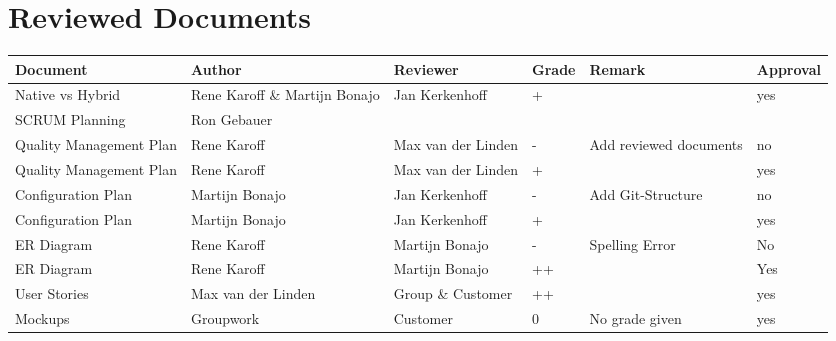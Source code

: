 \pagestyle{plain}
\begin{sidewaystable}
	\section*{Reviewed Documents}
		\begin{longtable}[htbp]{ l l l l l l}
			\textbf{Document} & \textbf{Author} & \textbf{Reviewer} & \textbf{Grade} & \textbf{Remark} & \textbf{Approval}\\ \hline
			Native vs Hybrid & Rene Karoff \& Martijn Bonajo & Jan Kerkenhoff &+& & yes\\
			SCRUM Planning & Ron Gebauer & & & & \\
			Quality Management Plan & Rene Karoff & Max van der Linden &-&  Add reviewed documents& no \\
			Quality Management Plan & Rene Karoff & Max van der Linden &+& & yes \\
			Configuration Plan & Martijn Bonajo & Jan Kerkenhoff &-& Add Git-Structure & no\\
			Configuration Plan & Martijn Bonajo & Jan Kerkenhoff &+&  & yes\\
			ER Diagram & Rene Karoff & Martijn Bonajo & - & Spelling Error& No\\
			ER Diagram & Rene Karoff & Martijn Bonajo &++&& Yes\\
			User Stories & Max van der Linden & Group \& Customer & ++ & & yes \\
			Mockups & Groupwork & Customer & 0 & No grade given &  yes\\
		\end{longtable}
\end{sidewaystable}
